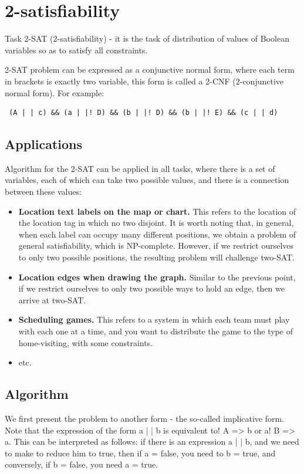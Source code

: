 \section{ 2-satisfiability }
Task 2-SAT (2-satisfiability) - it is the task of distribution of values ​​of Boolean variables so as to satisfy all constraints.

2-SAT problem can be expressed as a conjunctive normal form, where each term in brackets is exactly two variable, this form is called a 2-CNF (2-conjunctive normal form). For example:

\begin{verbatim}
 (A | | c) && (a | |! D) && (b | |! D) && (b | |! E) && (c | | d) 
\end{verbatim} \subsection{ Applications }
Algorithm for the 2-SAT can be applied in all tasks, where there is a set of variables, each of which can take two possible values, and there is a connection between these values:

\begin{itemize} \item \textbf{Location text labels on the map or chart.} 
This refers to the location of the location tag in which no two disjoint. 
It is worth noting that, in general, when each label can occupy many different positions, we obtain a problem of general satisfiability, which is NP-complete. However, if we restrict ourselves to only two possible positions, the resulting problem will challenge two-SAT. \item \textbf{Location edges when drawing the graph.} 
Similar to the previous point, if we restrict ourselves to only two possible ways to hold an edge, then we arrive at two-SAT. \item \textbf{Scheduling games.} 
This refers to a system in which each team must play with each one at a time, and you want to distribute the game to the type of home-visiting, with some constraints. \item etc. \end{itemize}

\subsection{ Algorithm }
We first present the problem to another form - the so-called implicative form. Note that the expression of the form a | | b is equivalent to! A => b or a! B => a. This can be interpreted as follows: if there is an expression a | | b, and we need to make to reduce him to true, then if a = false, you need to b = true, and conversely, if b = false, you need a = true.

